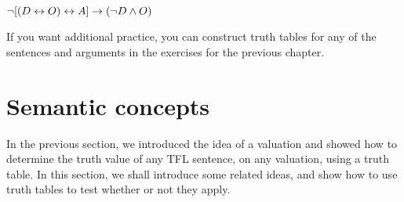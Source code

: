 \begin{earg}
%	


\item	$\neg [(D \leftrightarrow O) \leftrightarrow A] \rightarrow (\neg D \wedge O) $

\end{earg}


If you want additional practice, you can construct truth tables for any of the sentences and arguments in the exercises for the previous chapter.


\chapter{Semantic concepts}
In the previous section, we introduced the idea of a valuation and showed how to determine the truth value of any TFL sentence, on any valuation, using a truth table. In this section, we shall introduce some related ideas, and show how to use truth tables to test whether or not they apply.



